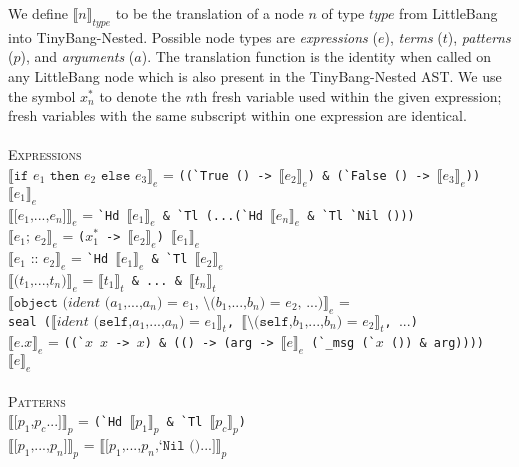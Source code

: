 \documentclass{article}
\begin{document}
\newcommand{\translate}[2]{\ensuremath{\llbracket\texttt{#1}\rrbracket_{#2}}}
\newcommand{\fresh}[1]{\ensuremath{x^*_{#1}}}

We define $\llbracket n \rrbracket_{type}$ to be the translation of a node $n$ of type $type$ from LittleBang into TinyBang-Nested. Possible node types are \textit{expressions} ($e$), \textit{terms} ($t$), \textit{patterns} ($p$), and \textit{arguments} ($a$). The translation function is the identity when called on any LittleBang node which is also present in the TinyBang-Nested AST. We use the symbol \fresh{n} to denote the $n$th fresh variable used within the given expression; fresh variables with the same subscript within one expression are identical.\\
\\\textsc{Expressions}\\
\translate{if $e_1$ then $e_2$ else $e_3$}{e} = \verb|((`True () -> |\translate{$e_2$}{e}\verb|) & (`False () -> |\translate{$e_3$}{e}\verb|)) |\translate{$e_1$}{e}\\
\translate{[$e_1$,$...$,$e_n$]}{e} = \verb|`Hd |\translate{$e_1$}{e}\verb| & `Tl (...(`Hd |\translate{$e_n$}{e}\verb| & `Tl `Nil ()))|\\
\translate{$e_1$; $e_2$}{e} = \verb|(|\fresh{1}\verb| -> |\translate{$e_2$}{e}\verb|) |\translate{$e_1$}{e}\\
\translate{$e_1$ :: $e_2$}{e} = \verb|`Hd |\translate{$e_1$}{e}\verb| & `Tl |\translate{$e_2$}{e}\\
\translate{($t_1$,$...$,$t_n$)}{e} = \translate{$t_1$}{t}\verb| & ... & |\translate{$t_n$}{t}\\
\translate{object ($ident$ ($a_1$,$...$,$a_n$) = $e_1$, \textbackslash($b_1$,$...$,$b_n$) = $e_2$, $...$)}{e} = \\
\indent\indent\verb|seal (|\translate{$ident$ (self,$a_1$,$...$,$a_n$) = $e_1$}{t}\verb|, |\translate{\textbackslash(self,$b_1$,$...$,$b_n$) = $e_2$}{t}\verb|, |$...$\verb|)|\\
\translate{$e$.$x$}{e} = \verb|((`|$x$~$x$\verb| -> |$x$\verb|) & (() -> (arg -> |\translate{$e$}{e}\verb| (`_msg (`|$x$\verb| ()) & arg)))) |\translate{$e$}{e}\\
\\\textsc{Patterns}\\
\translate{[$p_1$,$p_c$...]}{p} = \verb|(`Hd |\translate{$p_1$}{p}\verb| & `Tl |\translate{$p_c$}{p}\verb|)|\\
\translate{[$p_1$,$...$,$p_n$]}{p} = \translate{[$p_1$,$...$,$p_n$,`Nil ()...]}{p}\\
\end{document}
